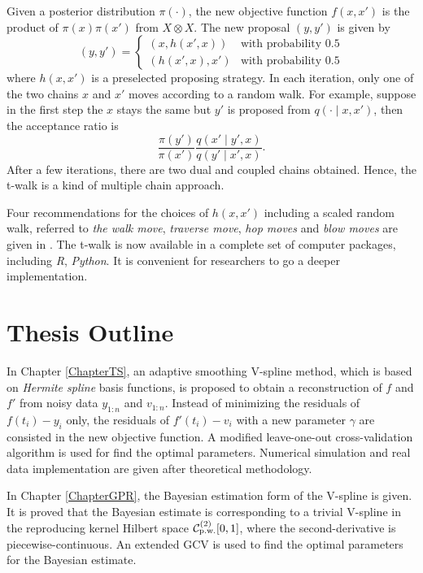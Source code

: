 Given a posterior distribution $\pi(\cdot)$, the new objective function $f(x,x')$ is the product of $\pi(x)\pi(x')$ from $X \otimes X$. The new proposal $(y,y')$ is given by
\begin{equation} (y,y') =
\begin{cases}
\left(x,h(x',x)\right) & \mbox{with probability 0.5}\\
\left(h(x',x),x'\right) & \mbox{with probability 0.5}
\end{cases}
\end{equation}
where $h(x,x')$ is a preselected proposing strategy. In each iteration, only one of the two chains $x$ and $x'$ moves according to a random walk. For example, suppose in the first step the $x$ stays the same but $y'$ is proposed from $q(\cdot\mid x,x')$, then the acceptance ratio is 
\begin{equation}
\frac{\pi\left(y'\right)}{\pi\left(x'\right)}\frac{q\left(x'\mid y',x\right) }{q\left(y'\mid x',x\right)}. 
\end{equation}
After a few iterations, there are two dual and coupled chains obtained. Hence, the t-walk is a kind of multiple chain approach. 

Four recommendations for the choices of $h\left(x,x'\right)$ including a scaled random walk, referred to \textit{the walk move}, \textit{traverse move}, \textit{hop moves} and \textit{blow moves} are given in \citep{christen2010general}. The t-walk is now available in a complete set of computer packages, including \textit{R}, \textit{Python}. It is convenient for researchers to go a deeper implementation. 



\section{Thesis Outline}

In Chapter \ref{ChapterTS}, an adaptive smoothing V-spline method, which is based on \textit{Hermite spline} basis functions, is proposed to obtain a reconstruction of $f$ and $f'$ from noisy data $y_{1:n}$ and $v_{1:n}$. Instead of minimizing the residuals of $f(t_i)-y_i$ only, the residuals of $f'(t_i)-v_i$ with a new parameter $\gamma$ are consisted in the new objective function. A modified leave-one-out cross-validation algorithm is used for find the optimal parameters. Numerical simulation and real data implementation are given after theoretical methodology. 

In Chapter \ref{ChapterGPR}, the Bayesian estimation form of the V-spline is given. It is proved that the Bayesian estimate is corresponding to a trivial V-spline  in the reproducing kernel Hilbert space $\mathcal{C}_{\mbox{\scriptsize p.w.}}^{(2)}[0,1]$, where the second-derivative is piecewise-continuous.  An extended GCV is used to find the optimal parameters for the Bayesian estimate. 

